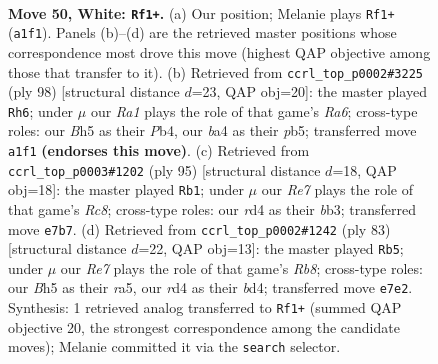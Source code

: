 \documentclass[11pt]{article}
\begin{document}
\clearpage

\begin{figure}[p]\centering
\begin{subfigure}{0.46\textwidth}\centering
\resizebox{\linewidth}{!}{%
\newchessgame
\chessboard[
  setfen={r7/4R3/pp6/5k1B/bP1r4/P6K/8/R7 w - - 2 50},
  showmover=false,
  pgfstyle=straightmove, color=movearrow, markmove={a1-f1}
]}
\caption{}
\end{subfigure}\hfill
\begin{subfigure}{0.46\textwidth}\centering
\resizebox{\linewidth}{!}{%
\newchessgame
\chessboard[
  setfen={8/5k1p/R7/1p2b2N/1P4P1/P7/6r1/2K5 w - - 5 50},
  showmover=false,
  pgfstyle=straightmove, color=movearrow, markmove={a6-h6}
]}
\caption{}
\end{subfigure}
\\[4pt]
\begin{subfigure}{0.46\textwidth}\centering
\resizebox{\linewidth}{!}{%
\newchessgame
\chessboard[
  setfen={8/5pk1/2b1p3/8/3K1PP1/1B6/5R2/2r5 b - - 0 48},
  showmover=false,
  pgfstyle=straightmove, color=movearrow, markmove={c1-b1}
]}
\caption{}
\end{subfigure}\hfill
\begin{subfigure}{0.46\textwidth}\centering
\resizebox{\linewidth}{!}{%
\newchessgame
\chessboard[
  setfen={6k1/3b2p1/6p1/R7/3B1p1P/5P2/6PK/1r6 b - - 6 42},
  showmover=false,
  pgfstyle=straightmove, color=movearrow, markmove={b1-b5}
]}
\caption{}
\end{subfigure}
\caption{\textbf{Move 50, White: \texttt{Rf1+}.} (a) Our position; Melanie plays \texttt{Rf1+} (\texttt{a1f1}). Panels (b)--(d) are the retrieved master positions whose correspondence most drove this move (highest QAP objective among those that transfer to it). (b) Retrieved from \texttt{ccrl\_top\_p0002\#3225} (ply 98) [structural distance $d$=23, QAP obj=20]: the master played \texttt{Rh6}; under $\mu$ our \emph{Ra1} plays the role of that game's \emph{Ra6}; cross-type roles: our \emph{B}h5 as their \emph{P}b4, our \emph{b}a4 as their \emph{p}b5; transferred move \texttt{a1f1} \textbf{(endorses this move)}. (c) Retrieved from \texttt{ccrl\_top\_p0003\#1202} (ply 95) [structural distance $d$=18, QAP obj=18]: the master played \texttt{Rb1}; under $\mu$ our \emph{Re7} plays the role of that game's \emph{Rc8}; cross-type roles: our \emph{r}d4 as their \emph{b}b3; transferred move \texttt{e7b7}. (d) Retrieved from \texttt{ccrl\_top\_p0002\#1242} (ply 83) [structural distance $d$=22, QAP obj=13]: the master played \texttt{Rb5}; under $\mu$ our \emph{Re7} plays the role of that game's \emph{Rb8}; cross-type roles: our \emph{B}h5 as their \emph{r}a5, our \emph{r}d4 as their \emph{b}d4; transferred move \texttt{e7e2}. Synthesis: 1 retrieved analog transferred to \texttt{Rf1+} (summed QAP objective 20, the strongest correspondence among the candidate moves); Melanie committed it via the \texttt{search} selector.}
\label{fig:thought-m98}
\end{figure}
\end{document}
